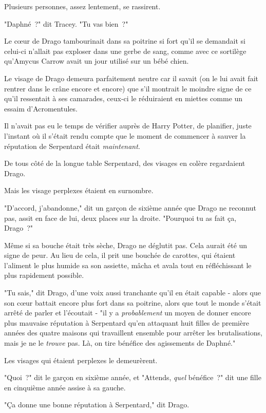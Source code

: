 Plusieurs personnes, assez lentement, se rassirent.

"Daphné~?" dit Tracey. "Tu vas bien~?"

\later

Le cœur de Drago tambourinait dans sa poitrine si fort qu'il se demandait si celui-ci n'allait pas exploser dans une gerbe de sang, comme avec ce sortilège qu'Amycus Carrow avait un jour utilisé sur un bébé chien.

Le visage de Drago demeura parfaitement neutre car il savait (on le lui avait fait rentrer dans le crâne encore et encore) que s'il montrait le moindre signe de ce qu'il ressentait à ses camarades, ceux-ci le réduiraient en miettes comme un essaim d'Acromentules.

Il n'avait pas eu le temps de vérifier auprès de Harry Potter, de planifier, juste l'instant où il s'était rendu compte que le moment de commencer à sauver la réputation de Serpentard était \emph{maintenant}.

De tous côté de la longue table Serpentard, des visages en colère regardaient Drago.

Mais les visage perplexes étaient en surnombre.

"D'accord, j'abandonne," dit un garçon de sixième année que Drago ne reconnut pas, assit en face de lui, deux places sur la droite. "Pourquoi tu as fait ça, Drago~?"

Même si sa bouche était très sèche, Drago ne déglutit pas. Cela aurait été un signe de peur. Au lieu de cela, il prit une bouchée de carottes, qui étaient l'aliment le plus humide sa son assiette, mâcha et avala tout en réfléchissant le plus rapidement possible.

"Tu sais," dit Drago, d'une voix aussi tranchante qu'il en était capable - alors que son cœur battait encore plus fort dans sa poitrine, alors que tout le monde s'était arrêté de parler et l'écoutait - "il y a \emph{probablement} un moyen de donner encore plus mauvaise réputation à Serpentard qu'en attaquant huit filles de première années des quatre maisons qui travaillent ensemble pour arrêter les brutalisations, mais je ne le \emph{trouve} pas. Là, on tire bénéfice des agissements de Daphné."

Les visages qui étaient perplexes le demeurèrent.

"Quoi~?" dit le garçon en sixième année, et "Attends, \emph{quel} bénéfice~?" dit une fille en cinquième année assise à sa gauche.

"Ça donne une bonne réputation à Serpentard," dit Drago.

